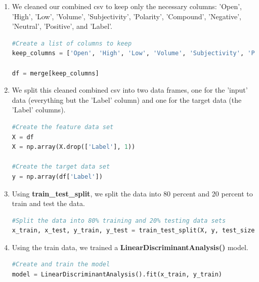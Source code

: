 \documentclass[10pt,twocolumn]{article}
\begin{document}
\begin{enumerate}
\begin{lstlisting}[language=Python, caption=Add sentiment scores]
#Store the sentiment scores in the merge data set
merge['Compound'] = compound
merge['Negative'] = neg
merge['Neutral'] = neu
merge['Positive'] = pos
\end{lstlisting}

    \item We cleaned our combined csv to keep only the necessary columns: 'Open', 'High', 'Low', 'Volume', 'Subjectivity', 'Polarity', 'Compound', 'Negative', 'Neutral', 'Positive', and 'Label'.

\begin{lstlisting}[language=Python, caption=Keep only necessary columns]
#Create a list of columns to keep
keep_columns = ['Open', 'High', 'Low', 'Volume', 'Subjectivity', 'Polarity', 'Compound', 'Negative', 'Neutral', 'Positive', 'Label']

df = merge[keep_columns]
\end{lstlisting}

    \item We split this cleaned combined csv into two data frames, one for the 'input' data (everything but the 'Label' column) and one for the target data (the 'Label' columns).

\begin{lstlisting}[language=Python, caption=Split into input and target data]
#Create the feature data set
X = df
X = np.array(X.drop(['Label'], 1))

#Create the target data set
y = np.array(df['Label'])
\end{lstlisting}

    \item Using \textbf{train\_test\_split}, we split the data into 80 percent and 20 percent to train and test the data.

\begin{lstlisting}[language=Python, caption=Split data into training and test]
#Split the data into 80% training and 20% testing data sets
x_train, x_test, y_train, y_test = train_test_split(X, y, test_size = 0.2, random_state = 0)
\end{lstlisting}

    \item Using the train data, we trained a \textbf{LinearDiscriminantAnalysis()} model.

\begin{lstlisting}[language=Python, caption=Train model]
#Create and train the model
model = LinearDiscriminantAnalysis().fit(x_train, y_train)
\end{lstlisting}


\end{enumerate}
\end{document}
